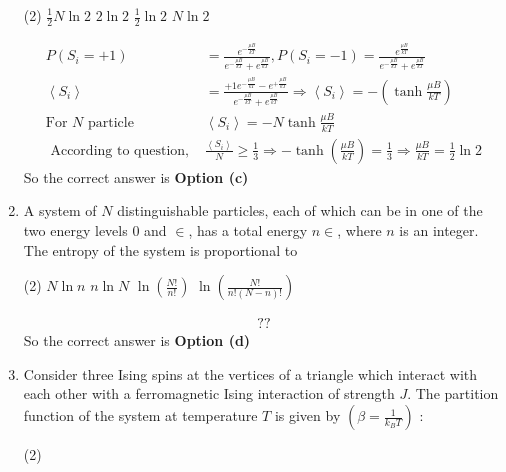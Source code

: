 \begin{enumerate}
	{	}
	\begin{tasks}(2)
		\task[\textbf{a.}]$\frac{1}{2} N \ln 2$
		\task[\textbf{b.}] $2 \ln 2$
		\task[\textbf{c.}]$\frac{1}{2} \ln 2$
		\task[\textbf{d.}] $N \ln 2$	
	\end{tasks}	
	\begin{answer}
		\begin{align*}
		P\left(S_{i}=+1\right)&=\frac{e^{-\frac{\mu B}{k T}}}{e^{-\frac{\mu B}{k T}}+e^{\frac{\mu B}{k T}}}, P\left(S_{i}=-1\right)=\frac{e^{\frac{\mu B}{k T}}}{e^{-\frac{\mu B}{k T}}+e^{\frac{\mu B}{k T}}}\\
		\left\langle S_{i}\right\rangle&=\frac{+1 e^{-\frac{\mu B}{k T}}-e^{+\frac{\mu B}{k T}}}{e^{-\frac{\mu B}{k T}}+e^{\frac{\mu B}{k T}}} \Rightarrow\left\langle S_{i}\right\rangle=-\left(\tanh \frac{\mu B}{k T}\right)\\
		\text{For $N$ particle }&\left\langle S_{i}\right\rangle=-N \tanh \frac{\mu B}{k T}\\
		\text{	According to question, }&\frac{\left\langle S_{i}\right\rangle}{N} \geq \frac{1}{3} \Rightarrow-\tanh \left(\frac{\mu B}{k T}\right)=\frac{1}{3} \Rightarrow \frac{\mu B}{k T}=\frac{1}{2} \ln 2
		\end{align*}
		So the correct answer is \textbf{Option (c)}
	\end{answer}
	\item A system of $N$ distinguishable particles, each of which can be in one of the two energy levels 0 and $\in$, has a total energy $n \in$, where $n$ is an integer. The entropy of the system is proportional to
	{	}
	\begin{tasks}(2)
		\task[\textbf{a.}]$N \ln n$
		\task[\textbf{b.}]$n \ln N$
		\task[\textbf{c.}] $\ln \left(\frac{N !}{n !}\right)$
		\task[\textbf{d.}] $\ln \left(\frac{N !}{n !(N-n) !}\right)$
	\end{tasks}
	\begin{answer}
		\begin{align*}
		??
		\end{align*}
		So the correct answer is \textbf{Option (d)}
	\end{answer}
	\item Consider three Ising spins at the vertices of a triangle which interact with each other with a ferromagnetic Ising interaction of strength $J$. The partition function of the system at temperature $T$ is given by $\left(\beta=\frac{1}{k_{B} T}\right)$ :
	{	}
	\begin{tasks}(2)

\end{tasks}
\end{enumerate}
